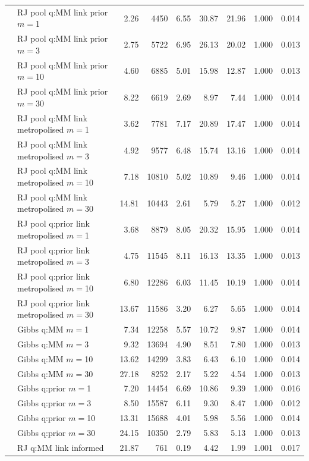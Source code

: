 \begin{tabular}{ll rrrrrrr}
 & RJ pool q:MM link prior $m=$1 & 2.26 & 4450 & 6.55 & 30.87 & 21.96 & 1.000 & 0.014 \\
 & RJ pool q:MM link prior $m=$3 & 2.75 & 5722 & 6.95 & 26.13 & 20.02 & 1.000 & 0.013 \\
 & RJ pool q:MM link prior $m=$10 & 4.60 & 6885 & 5.01 & 15.98 & 12.87 & 1.000 & 0.013 \\
 & RJ pool q:MM link prior $m=$30 & 8.22 & 6619 & 2.69 & 8.97 & 7.44 & 1.000 & 0.014 \\
 & RJ pool q:MM link metropolised $m=$1 & 3.62 & 7781 & 7.17 & 20.89 & 17.47 & 1.000 & 0.014 \\
 & RJ pool q:MM link metropolised $m=$3 & 4.92 & 9577 & 6.48 & 15.74 & 13.16 & 1.000 & 0.014 \\
 & RJ pool q:MM link metropolised $m=$10 & 7.18 & 10810 & 5.02 & 10.89 & 9.46 & 1.000 & 0.014 \\
 & RJ pool q:MM link metropolised $m=$30 & 14.81 & 10443 & 2.61 & 5.79 & 5.27 & 1.000 & 0.012 \\
 & RJ pool q:prior link metropolised $m=$1 & 3.68 & 8879 & 8.05 & 20.32 & 15.95 & 1.000 & 0.014 \\
 & RJ pool q:prior link metropolised $m=$3 & 4.75 & 11545 & 8.11 & 16.13 & 13.35 & 1.000 & 0.013 \\
 & RJ pool q:prior link metropolised $m=$10 & 6.80 & 12286 & 6.03 & 11.45 & 10.19 & 1.000 & 0.014 \\
 & RJ pool q:prior link metropolised $m=$30 & 13.67 & 11586 & 3.20 & 6.27 & 5.65 & 1.000 & 0.014 \\
 & Gibbs q:MM $m=$1 & 7.34 & 12258 & 5.57 & 10.72 & 9.87 & 1.000 & 0.014 \\
 & Gibbs q:MM $m=$3 & 9.32 & 13694 & 4.90 & 8.51 & 7.80 & 1.000 & 0.013 \\
 & Gibbs q:MM $m=$10 & 13.62 & 14299 & 3.83 & 6.43 & 6.10 & 1.000 & 0.014 \\
 & Gibbs q:MM $m=$30 & 27.18 & 8252 & 2.17 & 5.22 & 4.54 & 1.000 & 0.013 \\
 & Gibbs q:prior $m=$1 & 7.20 & 14454 & 6.69 & 10.86 & 9.39 & 1.000 & 0.016 \\
 & Gibbs q:prior $m=$3 & 8.50 & 15587 & 6.11 & 9.30 & 8.47 & 1.000 & 0.012 \\
 & Gibbs q:prior $m=$10 & 13.31 & 15688 & 4.01 & 5.98 & 5.56 & 1.000 & 0.014 \\
 & Gibbs q:prior $m=$30 & 24.15 & 10350 & 2.79 & 5.83 & 5.13 & 1.000 & 0.013 \\
 & RJ q:MM link informed & 21.87 & 761 & 0.19 & 4.42 & 1.99 & 1.001 & 0.017 \\

\end{tabular}
